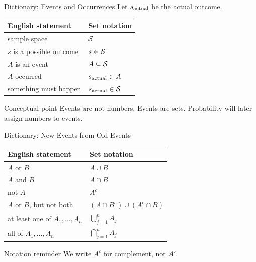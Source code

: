 
\begin{frame}{Dictionary: Events and Occurrences}
Let $s_{\mathrm{actual}}$ be the actual outcome.

\begin{center}
\begin{tabular}{ll}
\toprule
English statement & Set notation \\
\midrule
sample space & $\mathcal{S}$ \\
$s$ is a possible outcome & $s \in \mathcal{S}$ \\
$A$ is an event & $A \subseteq \mathcal{S}$ \\
$A$ occurred & $s_{\mathrm{actual}} \in A$ \\
something must happen & $s_{\mathrm{actual}} \in \mathcal{S}$ \\
\bottomrule
\end{tabular}
\end{center}

\vspace{0.3cm}

\begin{keybox}{Conceptual point}
Events are not numbers. Events are sets. Probability will later assign numbers to events.
\end{keybox}
\end{frame}

\begin{frame}{Dictionary: New Events from Old Events}
\begin{center}
\begin{tabular}{ll}
\toprule
English statement & Set notation \\
\midrule
$A$ or $B$ & $A \cup B$ \\
$A$ and $B$ & $A \cap B$ \\
not $A$ & $A^c$ \\
$A$ or $B$, but not both & $(A \cap B^c) \cup (A^c \cap B)$ \\
at least one of $A_1,\dots,A_n$ & $\displaystyle \bigcup_{j=1}^n A_j$ \\
all of $A_1,\dots,A_n$ & $\displaystyle \bigcap_{j=1}^n A_j$ \\
\bottomrule
\end{tabular}
\end{center}

\vspace{0.25cm}

\begin{keybox}{Notation reminder}
We write $A^c$ for complement, not $A'$.
\end{keybox}
\end{frame}

